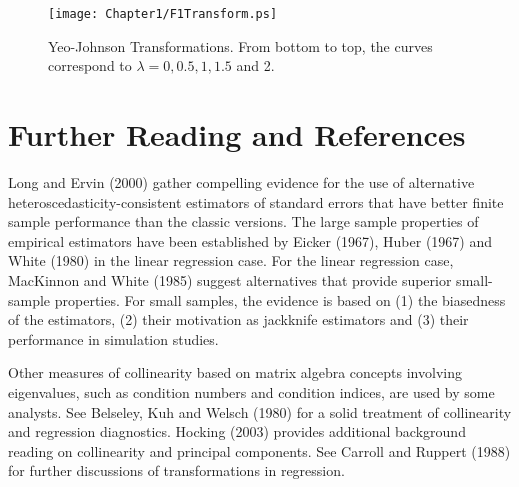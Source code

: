 \begin{figure}[htp]
  \centering
    \texttt{[image: Chapter1/F1Transform.ps]}
\caption{\label{F1:Transform} \small Yeo-Johnson Transformations.
From bottom to top, the curves correspond to $\lambda =0,0.5,1,1.5$
and 2.}
\end{figure}



\section{Further Reading and References}

Long and Ervin (2000) gather compelling evidence for the use of
alternative \newline heteroscedasticity-consistent estimators of
standard errors that have better finite sample performance than the
classic versions. The large sample properties of empirical
estimators have been established by Eicker (1967), Huber (1967) and
White (1980) in the linear regression case. For the linear
regression case, MacKinnon and White (1985) suggest alternatives
that provide superior small-sample properties. For small samples,
the evidence is based on (1) the biasedness of the estimators, (2)
their motivation as jackknife estimators and (3) their performance
in simulation studies.

Other measures of collinearity based on matrix algebra concepts
involving eigenvalues, such as condition numbers and condition
indices, are used by some analysts. See Belseley, Kuh and Welsch
(1980) for a solid treatment of collinearity and regression
diagnostics. Hocking (2003) provides additional background reading
on collinearity and principal components. See Carroll and Ruppert
(1988) for further discussions of transformations in regression.

\bigskip

